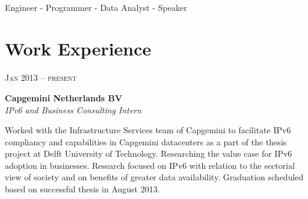 \documentclass[10pt]{article} %
\begin{document}
\color{text1} %


\par{\\ %
{\color{headings} Engineer - Programmer - Data Analyst - Speaker\par} %

\begin{minipage}[t]{0.5\textwidth} %
\vspace{0pt} %
	

\section{Work Experience} 


{\raggedleft\textsc{Jan 2013 -- present}\par}

{\raggedright\large \textbf{Capgemini Netherlands BV}\\
\textit{IPv6 and Business Consulting Intern}\\[5pt]}

\normalsize{Worked with the Infrastructure Services team of Capgemini to facilitate IPv6 compliancy and capabilities in Capgemini datacenters as a part of the thesis project at Delft University of Technology. Researching the value case for IPv6 adoption in businesses. Research focused on IPv6 with relation to the sectorial view of society and on benefits of greater data availability. Graduation scheduled based on successful thesis in August 2013.}\\



\end{minipage}}
\end{document}
